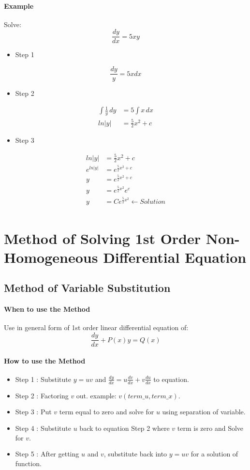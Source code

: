 \paragraph{Example} Solve:
\[
\frac{dy}{dx} = 5xy
\]
\begin{itemize}
	\item Step 1
\end{itemize}
\[
\frac{dy}{y} = 5xdx
\]
\begin{itemize}
	\item Step 2
\end{itemize}
\[
\begin{split}
	\int \frac{1}{y} \,dy &= 5 \int x \,dx \\
	ln|y| &= \frac{5}{2} x^2 + c
\end{split}
\]
\begin{itemize}
	\item Step 3
\end{itemize}
\[
\begin{split}
	ln|y| &= \frac{5}{2} x^2 + c \\
	e^{ln|y|} &= e^{\frac{5}{2} x^2 + c}\\
	y &= e^{\frac{5}{2} x^2 + c}\\
	y &= e^{\frac{5}{2} x^2}e^{c}\\
	y &= Ce^{\frac{5}{2} x^2} \leftarrow Solution\\ 
\end{split}
\]


\section{Method of Solving 1st Order Non-Homogeneous Differential Equation}
\subsection{Method of Variable Substitution}
\begin{tcolorbox}[title=Method]
	\paragraph{When to use the Method} Use in general form of 1st order linear differential equation of:
	\[\frac{dy}{dx} + P(x)y = Q(x)\]
	\paragraph{How to use the Method}
	\begin{itemize}
		\item Step 1 : Substitute $ y = uv $ and $ \frac{dy}{dx} = u\frac{dv}{dx} + v \frac{du}{dx}$ to equation.
		\item Step 2 : Factoring $ v $ out. example: $ v(term\_u, term\_x) $.
		\item Step 3 : Put $ v $ term equal to zero and solve for $ u $ using separation of variable.
		\item Step 4 : Substitute $ u $ back to equation Step 2 where $ v $ term is zero and Solve for $ v $.
		\item Step 5 : After getting $ u $ and $v$, substitute back into $ y = uv $ for a solution of function.
	\end{itemize}
\end{tcolorbox}

